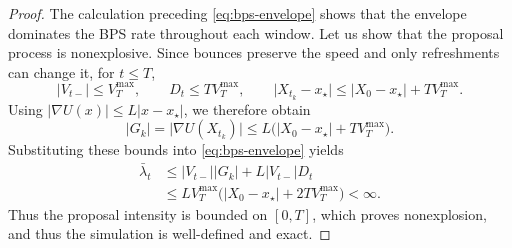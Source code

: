 \documentclass{amsart}
\theoremstyle{plain}
\theoremstyle{definition}
\theoremstyle{remark}
\newcommand{\abs}[1]{\lvert#1\rvert}
\newcommand{\1}{\mathbf 1}
\begin{document}
\begin{proof}
The calculation preceding \eqref{eq:bps-envelope} shows that the envelope
dominates the BPS rate throughout each window.
Let us show that the proposal process is nonexplosive.  Since bounces
preserve the speed and only refreshments can change it, for $t\le T$,
\[
        \abs{V_{t-}}\le V_T^{\max},
        \qquad
        D_t\le T V_T^{\max},
        \qquad
        \abs{X_{t_k}-x_\star}
        \le\abs{X_0-x_\star}+T V_T^{\max}.
\]
Using $\abs{\nabla U(x)}\le L\abs{x-x_\star}$, we therefore obtain
\[
        \abs{G_k}
        =\abs{\nabla U(X_{t_k})}
        \le L\bigl(\abs{X_0-x_\star}+T V_T^{\max}\bigr).
\]
Substituting these bounds into \eqref{eq:bps-envelope} yields
\[
\begin{aligned}
        \bar\lambda_t
        &\le \abs{V_{t-}}\abs{G_k}
             +L\abs{V_{t-}}D_t\\
        &\le LV_T^{\max}
             \bigl(\abs{X_0-x_\star}+2TV_T^{\max}\bigr)<\infty.
\end{aligned}
\]
Thus the proposal intensity is bounded on $[0,T]$, which proves
nonexplosion, and thus the simulation is well-defined and exact.


\end{proof}
\end{document}
